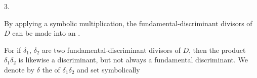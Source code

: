 3. 

By applying a symbolic multiplication, the fundamental-discriminant divisors of $D$
can be made into an .

For if $\delta_1$, $\delta_2$ are two fundamental-discriminant divisors of $D$, then
the product $\delta_1\delta_2$ is likewise a discriminant, but not always
a fundamental discriminant. We denote by $\delta$ the 
of $\delta_1\delta_2$ and set symbolically

